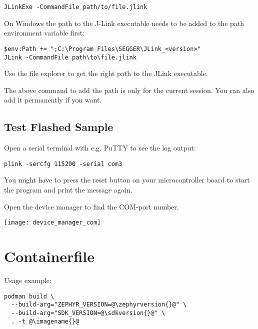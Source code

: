 \begin{lstlisting}
JLinkExe -CommandFile path/to/file.jlink
\end{lstlisting}

On Windows the path to the J-Link executable needs to be added to the path environment variable first:

\begin{lstlisting}
$env:Path += ";C:\Program Files\SEGGER\JLink_<version>"
JLink -CommandFile path\to\file.jlink
\end{lstlisting}

\begin{infobox}
  Use the file explorer to get the right path to the JLink executable.
\end{infobox}

\begin{infobox}
  The above command to add the path is only for the current session.
  You can also add it permanently if you want.
\end{infobox}

\subsection{Test Flashed Sample}

Open a serial terminal with e.g. PuTTY to see the log output:

\begin{lstlisting}
plink -sercfg 115200 -serial com3
\end{lstlisting}

You might have to press the reset button on your microcontroller board to start the program and print the message again.

\begin{infobox}
  Open the device manager to find the COM-port number.
  \begin{center}
    \texttt{[image: device\_manager\_com]}
  \end{center}
\end{infobox}

\newpage

\appendix

\fancyfoot{}

\section{Containerfile}\label{containerfile}



Usage example:

\begin{lstlisting}
podman build \
  --build-arg="ZEPHYR_VERSION=@\zephyrversion{}@" \
  --build-arg="SDK_VERSION=@\sdkversion{}@" \
  . -t @\imagename{}@
\end{lstlisting}



